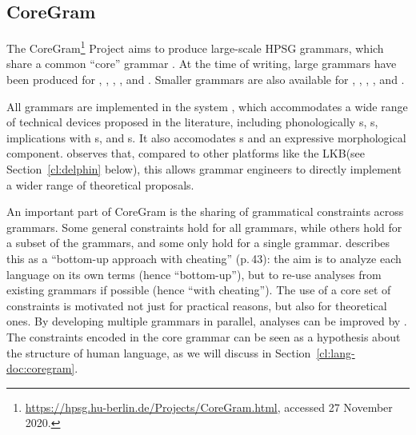 \documentclass[output=paper
	        ,collection
	        ,collectionchapter
 	        ,biblatex
                ,babelshorthands
                ,newtxmath
                ,draftmode
                ,colorlinks, citecolor=brown
]{langscibook}
\begin{document}
\subsection{CoreGram}
\label{cl:coregram}

%
%
The CoreGram\footnote{
	\url{https://hpsg.hu-berlin.de/Projects/CoreGram.html}, accessed 27 November 2020.
} Project
aims to produce large-scale HPSG grammars,
which share a common ``core'' grammar \citep{MuellerCoreGram}.
At the time of writing, large grammars have been produced for
 \citep{MuellerLehrbuch1},
 \citep{MOeDanish},
 \citep{MG2010a},
 \citep{MuellerMalteseSketch},
and  \citep{ML2013a}.
Smaller grammars are also available for , , , , and .

All grammars are implemented
in the  system \citep{MPR2002a-u,Penn2004a-u},
which accommodates a wide range of technical devices proposed in the literature, including
phonologically s,
s,
implications with s,
and s.
It also accomodates s and an expressive morphological component.
\citet{MelnikHandWritten} observes that,
compared to other platforms like the LKB\indexlkb (see Section~\ref{cl:delphin} below),
this allows grammar engineers to directly implement a wider range of theoretical proposals.

An important part of CoreGram is the sharing of grammatical constraints across grammars.
Some general constraints hold for all grammars,
while others hold for a subset of the grammars,
and some only hold for a single grammar.
\citet{MuellerCoreGram} describes this as a
``bottom-up approach with cheating'' (p.\,43):
the aim is to analyze each language on its own terms (hence ``bottom-up''),
but to re-use analyses from existing grammars if possible (hence ``with cheating'').
The use of a core set of constraints is motivated not just for practical reasons,
but also for theoretical ones.
By developing multiple grammars in parallel,
analyses can be improved by .
The constraints encoded in the core grammar
can be seen as a hypothesis about the structure of human language,
as we will discuss in Section~\ref{cl:lang-doc:coregram}.
\end{document}
